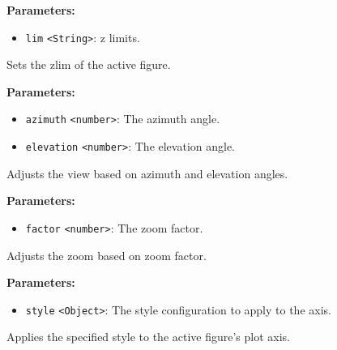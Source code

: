 \documentclass[12pt,a4paper]{article}
\begin{document}
\noindent \textbf{Parameters:}
\begin{itemize}
  \item \texttt{lim} \texttt{<String>}: z limits.
\end{itemize}

\noindent Sets the zlim of the active figure.

\vspace{5mm}
\noindent {}


\noindent \textbf{Parameters:}
\begin{itemize}
  \item \texttt{azimuth} \texttt{<number>}: The azimuth angle.
  \item \texttt{elevation} \texttt{<number>}: The elevation angle.
\end{itemize}

\noindent Adjusts the view based on azimuth and elevation angles.

\vspace{5mm}
\noindent {}


\noindent \textbf{Parameters:}
\begin{itemize}
  \item \texttt{factor} \texttt{<number>}: The zoom factor.
\end{itemize}

\noindent Adjusts the zoom based on zoom factor.

\vspace{5mm}
\noindent {}


\noindent \textbf{Parameters:}
\begin{itemize}
  \item \texttt{style} \texttt{<Object>}: The style configuration to apply to the axis.
\end{itemize}

\noindent Applies the specified style to the active figure's plot axis.

\vspace{5mm}
\noindent {}
\end{document}
